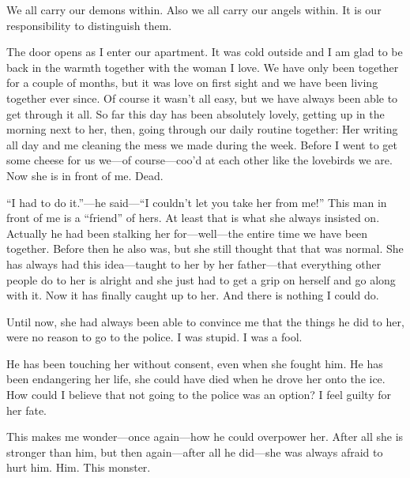\documentclass{article}
\title{\vspace{-2cm}\titlevar}
\author{\authorvar}
\date{\datevar}
\begin{document}
	\maketitle
	
	We all carry our demons within. Also we all carry our angels within. It is our responsibility to distinguish them.
	
	\medskip
	
	The door opens as I enter our apartment. It was cold outside and I am glad to be back in the warmth together with the woman I love. We have only been together for a couple of months, but it was love on first sight and we have been living together ever since. Of course it wasn't all easy, but we have always been able to get through it all. So far this day has been absolutely lovely, getting up in the morning next to her, then, going through our daily routine together: Her writing all day and me cleaning the mess we made during the week. Before I went to get some cheese for us we—of course—coo'd at each other like the lovebirds we are. Now she is in front of me. Dead.
	
	\medskip
	
	\enquote{I had to do it.}—he said—\enquote{I couldn't let you take her from me!} This man in front of me is a \enquote{friend} of hers. At least that is what she always insisted on. Actually he had been stalking her for—well—the entire time we have been together. Before then he also was, but she still thought that that was normal. She has always had this idea—taught to her by her father—that everything other people do to her is alright and she just had to get a grip on herself and go along with it. Now it has finally caught up to her. And there is nothing I could do.
	
	\medskip
	
	Until now, she had always been able to convince me that the things he did to her, were no reason to go to the police. I was stupid. I was a fool.
	
	\medskip
	
	He has been touching her without consent, even when she fought him. He has been endangering her life, she could have died when he drove her onto the ice. How could I believe that not going to the police was an option? I feel guilty for her fate.
	
	\medskip
	
	This makes me wonder—once again—how he could overpower her. After all she is stronger than him, but then again—after all he did—she was always afraid to hurt him. Him. This monster.
	
\end{document}
